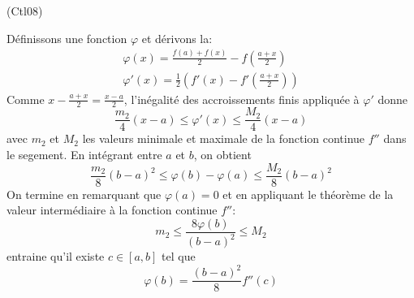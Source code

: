 \begin{tiny}(Ctl08)\end{tiny} Définissons une fonction $\varphi$ et dérivons la:
\begin{multline*}
  \varphi(x) = \frac{f(a)+f(x)}{2} - f(\frac{a+x}{2})\\
\varphi'(x) = \frac{1}{2}\left(f'(x)-f'(\frac{a+x}{2}) \right) 
\end{multline*}
Comme $x-\frac{a+x}{2}=\frac{x-a}{2}$, l'inégalité des accroissements finis appliquée à $\varphi'$ donne
\begin{displaymath}
  \frac{m_2}{4}(x-a)\leq \varphi'(x)\leq \frac{M_2}{4}(x-a) 
\end{displaymath}
avec $m_2$ et $M_2$ les valeurs minimale et maximale de la fonction continue $f''$ dans le segement.\newline
En intégrant entre $a$ et $b$, on obtient 
\begin{displaymath}
  \frac{m_2}{8}(b-a)^2\leq \varphi(b)-\varphi(a)\leq \frac{M_2}{8}(b-a)^2
\end{displaymath}
On termine en remarquant que $\varphi(a)=0$ et en appliquant le théorème de la valeur intermédiaire à la fonction continue $f''$:
\begin{displaymath}
  m_2\leq \frac{8\varphi(b)}{(b-a)^2}\leq M_2  
\end{displaymath}
entraine qu'il existe $c\in [a,b]$ tel que 
\begin{displaymath}
  \varphi(b) = \frac{(b-a)^2}{8}f''(c)
\end{displaymath}
